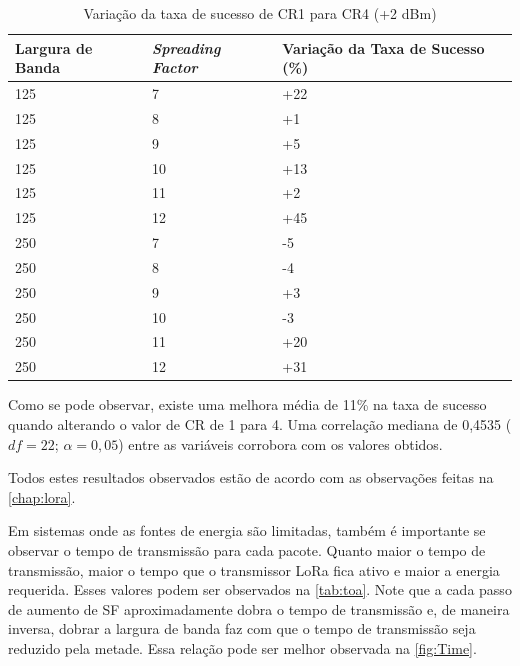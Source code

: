 \documentclass[
	12pt,				%
	openright,			%
	twoside,			%
	a4paper,			%
	english,			%
	french,				%
	spanish,			%
	brazil				%
	]{abntex2}
\begin{document}
\begin{table}[H]
\centering
\caption{Variação da taxa de sucesso de CR1 para CR4 (+2 dBm)}
\label{tab:DSR}
\begin{tabular}{|l|l|l|}
\hline
Largura de Banda & \textit{Spreading Factor} & Variação da Taxa de Sucesso (\%) \\ \hline
125 & 7 & +22 \\
125 & 8 & +1 \\
125 & 9 & +5 \\
125 & 10 & +13 \\
125 & 11 & +2 \\
125 & 12 & +45 \\ \hline
250 & 7 & -5 \\
250 & 8 & -4 \\
250 & 9 & +3 \\
250 & 10 & -3 \\
250 & 11 & +20 \\
250 & 12 & +31 \\ \hline
\end{tabular}
\end{table}

Como se pode observar, existe uma melhora média de 11\% na taxa de sucesso quando alterando o valor de CR de 1 para 4. Uma correlação mediana de 0,4535 ($df = 22$; $\alpha = 0,05$) entre as variáveis corrobora com os valores obtidos.

Todos estes resultados observados estão de acordo com as observações feitas na \autoref{chap:lora}.

Em sistemas onde as fontes de energia são limitadas, também é importante se observar o tempo de transmissão para cada pacote. Quanto maior o tempo de transmissão, maior o tempo que o transmissor LoRa fica ativo e maior a energia requerida. Esses valores podem ser observados na \autoref{tab:toa}. Note que a cada passo de aumento de SF aproximadamente dobra o tempo de transmissão e, de maneira inversa, dobrar a largura de banda faz com que o tempo de transmissão seja reduzido pela metade. Essa relação pode ser melhor observada na \autoref{fig:Time}.
\end{document}

